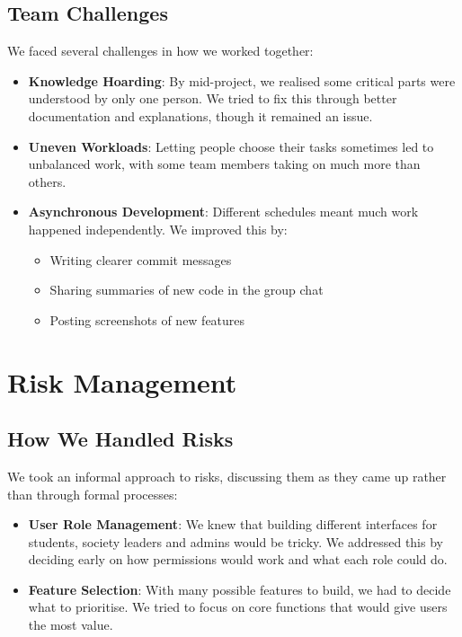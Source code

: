 \subsection{Team Challenges}

We faced several challenges in how we worked together:

\begin{itemize}
    \item \textbf{Knowledge Hoarding}: By mid-project, we realised some critical parts were understood by only one person. We tried to fix this through better documentation and explanations, though it remained an issue.
    
    \item \textbf{Uneven Workloads}: Letting people choose their tasks sometimes led to unbalanced work, with some team members taking on much more than others.
    
    \item \textbf{Asynchronous Development}: Different schedules meant much work happened independently. We improved this by:
    \begin{itemize}
        \item Writing clearer commit messages
        \item Sharing summaries of new code in the group chat
        \item Posting screenshots of new features
    \end{itemize}
\end{itemize}

\section{Risk Management}

\subsection{How We Handled Risks}

We took an informal approach to risks, discussing them as they came up rather than through formal processes:

\begin{itemize}
    \item \textbf{User Role Management}: We knew that building different interfaces for students, society leaders and admins would be tricky. We addressed this by deciding early on how permissions would work and what each role could do.
    
    \item \textbf{Feature Selection}: With many possible features to build, we had to decide what to prioritise. We tried to focus on core functions that would give users the most value.
    
\end{itemize}

